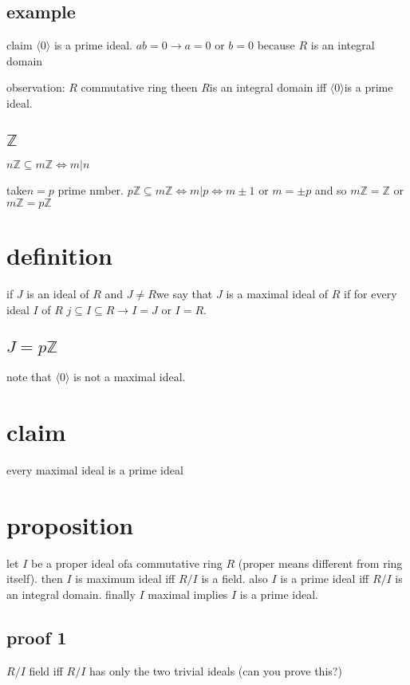 \documentclass[letterpaper]{article}
\begin{document}
\subsection*{example}
claim $\langle0\rangle$ is a prime ideal. $ab=0\to a=0$ or $b=0$ because $R$ is an integral domain

observation: $R$ commutative ring theen $R$is an integral domain iff $\langle0\rangle$is a prime ideal.

\subsection*{$\mathbb{Z}$}
$n\mathbb{Z}\subseteq m\mathbb{Z}\Leftrightarrow m|n$

take$n=p$ prime nmber. $p\mathbb{Z}\subseteq m\mathbb{Z}\Leftrightarrow m|p\Leftrightarrow m\pm 1$ or $m=\pm p$ and so $m\mathbb{Z}=\mathbb{Z}$ or $m\mathbb{Z}=p\mathbb{Z}$


\section*{definition}
if $J$ is an ideal of $R$ and $J\ne R$we say that $J$ is a maximal ideal of $R$ if for every ideal $I$ of $R$ $j\subseteq I\subseteq R\to I=J$ or $I=R$.

\subsection*{$J=p\mathbb{Z}$}
note that $\langle0\rangle$ is not a maximal ideal. 

\section*{claim}
every maximal ideal is a prime ideal

\section*{proposition}
let $I$ be a proper ideal ofa commutative ring $R$ (proper means different from ring itself). then $I$ is maximum ideal iff $R/I$ is a field. also $I$ is a prime ideal iff $R/I$ is an integral domain. finally $I$ maximal implies $I$ is a prime ideal.

\subsection*{proof 1}
$R/I$ field iff $R/I$ has only the two trivial ideals (can you prove this?)
\end{document}
